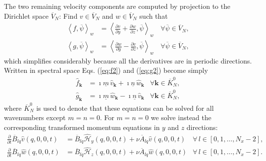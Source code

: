 \documentclass[11pt, oneside]{article}
\newcommand{\D}[1]{\overline{#1}}
\begin{document}
The two remaining velocity components are computed by projection to the 
Dirichlet space $\D{V}_N$: Find 
${v} \in \D{V}_N$ and $w \in \D{V}_N$ such that
\begin{align}
\left<f, \D{\psi}\right>_w &= \left<\frac{\partial v}{\partial y} + 
\frac{\partial w}{\partial z}, \D{\psi}\right>_w \, &\forall \D{\psi} \in 
\D{V}_N, \label{eq:f2} \\
\left<g, \D{\psi}\right>_w &= \left<\frac{\partial w}{\partial y}  - 
\frac{\partial v}{\partial z}, \D{\psi}\right>_w \, &\forall \D{\psi} \in 
\D{V}_N, \label{eq:g2}
\end{align}
which simplifies considerably because all the derivatives are in periodic 
directions. Written in spectral space Eqs. (\ref{eq:f2}) and (\ref{eq:g2}) 
become simply
\begin{align}
\hat{f}_{\bm{k}} &= \imath \underline{m}\, \hat{v}_{\bm{k}} + \imath 
\underline{n}\, \hat{w}_{\bm{k}} &\forall \bm{k} \in \D{K}_N^0, \label{eq:f3} \\
\hat{g}_{\bm{k}} &= \imath \underline{m}\, \hat{w}_{\bm{k}} - \imath 
\underline{n}\, \hat{v}_{\bm{k}} & \forall \bm{k} \in \D{K}_N^0, \label{eq:g3}
\end{align}
where $\D{K}_N^0$ is used to denote that these equations can be solved for all 
wavenumbers except $m=n=0$. For $m=n=0$ we solve instead the 
corresponding transformed momentum equations in $y$ and $z$ directions:
\begin{align}
\frac{\partial }{\partial t} \D{B}_{lq}\hat{v}(q, 0, 0, t) &= 
\D{B}_{lq}\hat{\mathcal{H}}_y(q, 0, 0, t) + \nu \D{A}_{lq} \hat{v}(q, 0, 0, t) 
& \forall\, l \in [0, 1, 
\ldots, N_x-2], \label{eq:v0}\\
\frac{\partial }{\partial t} \D{B}_{lq}\hat{w}(q, 0, 0, t) &= 
\D{B}_{lq}\hat{\mathcal{H}}_z(q, 0, 0, t) + \nu \D{A}_{lq} \hat{w}(q, 0, 0, t) 
& \forall\, l \in [0, 1, \ldots, N_x-2].\label{eq:w0}
\end{align}
\end{document}
